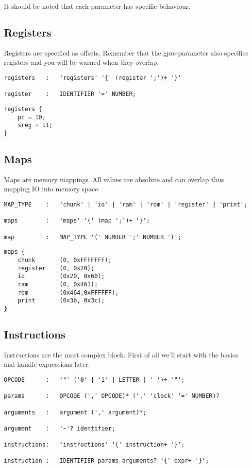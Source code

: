 It should be noted that each parameter has specific behaviour.

\subsection{Registers}
Registers are specified as offsets. Remember that the gprs-parameter also
specifies registers and you will be warned when they overlap.
\lstset{caption=Register specification}
\begin{lstlisting}
registers	:	'registers' '{' (register ';')+ '}'

register	:	IDENTIFIER '=' NUMBER;
\end{lstlisting}

\lstset{caption=Example register specification}
\begin{lstlisting}
registers {
	pc = 10;
	sreg = 11;
}
\end{lstlisting}

\subsection{Maps}
Maps are memory mappings. All values are absolute and can overlap thus mapping
IO into memory space.
\lstset{caption=Memory mapping specification}
\begin{lstlisting}
MAP_TYPE	:	'chunk' | 'io' | 'ram' | 'rom' | 'register' | 'print';

maps		:	'maps' '{' (map ';')+ '}';

map			:	MAP_TYPE '(' NUMBER ';' NUMBER ')';
\end{lstlisting}

\lstset{caption=Example memory mapping}
\begin{lstlisting}
maps {
	chunk		(0, 0xFFFFFFF);
	register	(0, 0x20);
	io			(0x20, 0x60);
	ram			(0, 0x461);
	rom			(0x464,0xFFFFFF);
	print		(0x3b, 0x3c);
}
\end{lstlisting}

\subsection{Instructions}
Instructions are the most complex block. First of all we'll start with the
basics and handle expressions later.
\lstset{caption=Instruction specification}
\begin{lstlisting}
OPCODE		:	'"' ('0' | '1' | LETTER | ' ')+ '"';

params		:	OPCODE (',' OPCODE)* (',' 'clock' '=' NUMBER)?

arguments	:	argument (',' argument)*;

argument	:	'~'? identifier;

instructions:	'instructions' '{' instruction+ '}';

instruction	:	IDENTIFIER params arguments? '{' expr+ '}';
\end{lstlisting}

